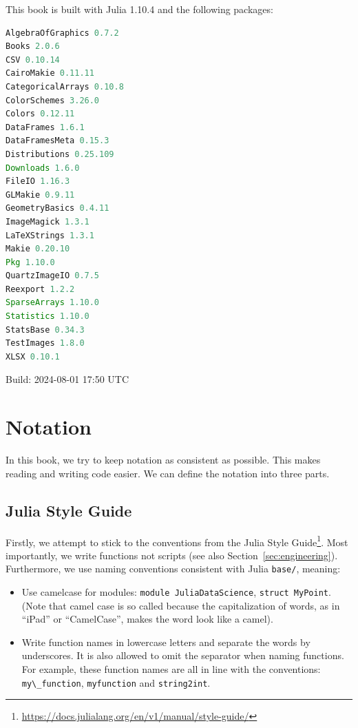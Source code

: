 \documentclass[
  notoc %
]{tufte-book}
\DeclareRobustCommand{\href}[2]{#2\footnote{\url{#1}}}
\providecommand{\tightlist}{%
  \setlength{\itemsep}{0pt}\setlength{\parskip}{0pt}
}
\newcommand{\passthrough}[1]{#1}
\begin{document}
This book is built with Julia 1.10.4 and the following packages:

\begin{lstlisting}[language=Julia]
AlgebraOfGraphics 0.7.2
Books 2.0.6
CSV 0.10.14
CairoMakie 0.11.11
CategoricalArrays 0.10.8
ColorSchemes 3.26.0
Colors 0.12.11
DataFrames 1.6.1
DataFramesMeta 0.15.3
Distributions 0.25.109
Downloads 1.6.0
FileIO 1.16.3
GLMakie 0.9.11
GeometryBasics 0.4.11
ImageMagick 1.3.1
LaTeXStrings 1.3.1
Makie 0.20.10
Pkg 1.10.0
QuartzImageIO 0.7.5
Reexport 1.2.2
SparseArrays 1.10.0
Statistics 1.10.0
StatsBase 0.34.3
TestImages 1.8.0
XLSX 0.10.1
\end{lstlisting}

Build: 2024-08-01 17:50 UTC

\hypertarget{sec:notation}{%
\section{Notation}\label{sec:notation}}

In this book, we try to keep notation as consistent as possible. This
makes reading and writing code easier. We can define the notation into
three parts.

\hypertarget{julia-style-guide}{%
\subsection{Julia Style Guide}\label{julia-style-guide}}

Firstly, we attempt to stick to the conventions from the
\href{https://docs.julialang.org/en/v1/manual/style-guide/}{Julia Style
Guide}. Most importantly, we write functions not scripts (see also
Section~\ref{sec:engineering}). Furthermore, we use naming conventions
consistent with Julia \passthrough{\lstinline!base/!}, meaning:

\begin{itemize}
\tightlist
\item
  Use camelcase for modules:
  \passthrough{\lstinline!module JuliaDataScience!},
  \passthrough{\lstinline!struct MyPoint!}. (Note that camel case is so
  called because the capitalization of words, as in ``iPad'' or
  ``CamelCase'', makes the word look like a camel).
\item
  Write function names in lowercase letters and separate the words by
  underscores. It is also allowed to omit the separator when naming
  functions. For example, these function names are all in line with the
  conventions: \passthrough{\lstinline!my\_function!},
  \passthrough{\lstinline!myfunction!} and
  \passthrough{\lstinline!string2int!}.
\end{itemize}
\end{document}

